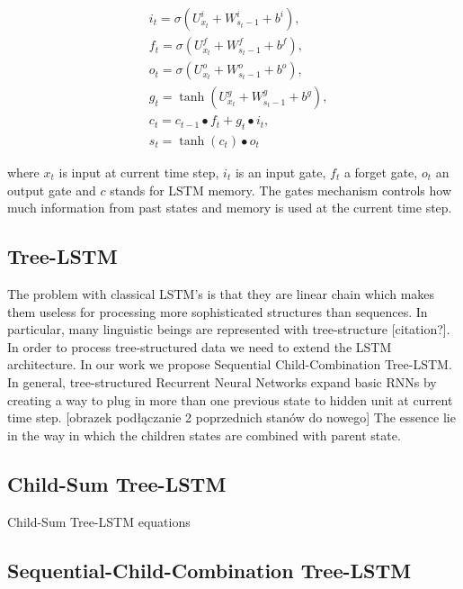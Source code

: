 \documentclass[10pt, a4paper]{article}
\begin{document}
\begin{equation}
\begin{split}
		&i_t = \sigma(U_{x_t}^i + W_{s_t-1}^i + b^i) ,\\
		&f_t = \sigma(U_{x_t}^f + W_{s_t-1}^f + b^f) ,\\
		&o_t = \sigma(U_{x_t}^o + W_{s_t-1}^o + b^o) ,\\
		&g_t = \tanh(U_{x_t}^g+ W_{s_t-1}^g + b^g) ,\\
		&c_t = c_{t-1} \bullet f_t + g_t \bullet i_t ,\\
		&s_t = \tanh(c_t) \bullet o_t 
\end{split}
\end{equation}

		where $x_t$ is input at current time step, $i_t$ is an input gate, $f_t$ a forget gate, $o_t$ an output gate and $c$ stands for LSTM memory.
		The gates mechanism controls how much information from past states and memory is used at the current time step. 

\subsection{Tree-LSTM}
	The problem with classical LSTM's is that they are linear chain which makes them useless for processing more sophisticated structures than sequences. In particular, many linguistic beings are represented with tree-structure [citation?].
	In order to process tree-structured data we need to extend the LSTM architecture. In our work we propose Sequential Child-Combination Tree-LSTM.
	In general, tree-structured Recurrent Neural Networks expand basic RNNs by creating a way to plug in more than one previous state to hidden unit at current time step.
	[obrazek podłączanie 2 poprzednich stanów do nowego]
	The essence lie in the way in which the children states are combined with parent state.

\subsection{Child-Sum Tree-LSTM}
Child-Sum Tree-LSTM equations

	
\subsection{Sequential-Child-Combination Tree-LSTM}
\end{document}
